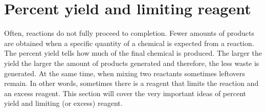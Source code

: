 \documentclass[main.tex]{subfiles}
\begin{document}
\section{Percent yield and limiting reagent}
Often, reactions do not fully proceed to completion. Fewer amounts of products are obtained when a specific quantity of a chemical is expected from a reaction. The percent yield tells how much of the final chemical is produced. The larger the yield the larger the amount of products generated and therefore, the less waste is generated. At the same time, when mixing two reactants sometimes leftovers remain. In other words, sometimes there is a reagent that limits the reaction and an excess reagent. This section will cover the very important ideas of percent yield and limiting (or excess) reagent.
\sloppy 
\begin{description}


\end{description}
\end{document}
